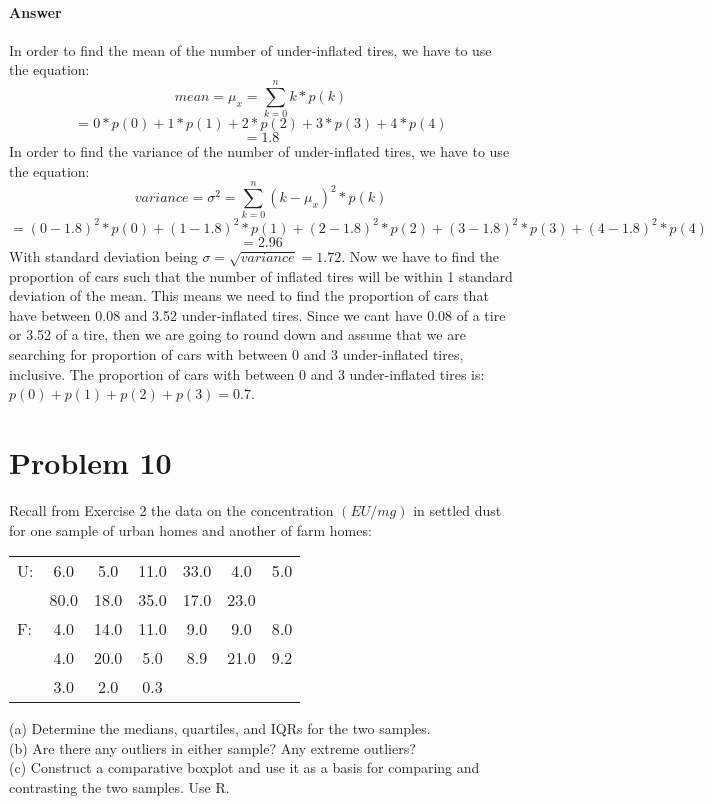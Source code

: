 \documentclass{article}
\begin{document}
	\paragraph{Answer} In order to find the mean of the number of under-inflated tires, we have to use the equation:
	\begin{displaymath}
		mean = \mu_x = \sum_{k=0}^{n}k*p(k)
	\end{displaymath}
	\begin{displaymath}
		= 0*p(0) + 1*p(1) + 2*p(2) + 3*p(3) + 4*p(4)
	\end{displaymath}
	\begin{displaymath}
		= 1.8
	\end{displaymath}
	In order to find the variance of the number of under-inflated tires, we have to use the equation:
	\begin{displaymath}
		variance = \sigma^2 = \sum_{k=0}^{n} (k-\mu_x)^2*p(k)
	\end{displaymath}
	\begin{displaymath}
		= (0-1.8)^2*p(0) + (1-1.8)^2*p(1) + (2-1.8)^2*p(2) + (3-1.8)^2*p(3)+(4-1.8)^2*p(4)
	\end{displaymath}
	\begin{displaymath}
		= 2.96
	\end{displaymath}
	With standard deviation being $\sigma = \sqrt{variance} = 1.72$. Now we have to find the proportion of cars such that the number of inflated tires will be within 1 standard deviation of the mean. This means we need to find the proportion of cars that have between 0.08 and 3.52 under-inflated tires. Since we cant have 0.08 of a tire or 3.52 of a tire, then we are going to round down and assume that we are searching for proportion of cars with between 0 and 3 under-inflated tires, inclusive. The proportion of cars with between 0 and 3 under-inflated tires is: $p(0) + p(1) + p(2) + p(3) = 0.7$.

\section*{Problem 10}
	
	Recall from Exercise 2 the data on the concentration $(EU/mg)$ in settled dust for one sample of urban homes and another of farm homes: 
	\begin{table}[!htb]
	\begin{tabular}{ l c c c c c c }
		U: & 6.0 & 5.0 & 11.0 & 33.0 & 4.0 & 5.0 \\
		& 80.0 & 18.0 & 35.0 & 17.0 & 23.0 & \\
		F: & 4.0 & 14.0 & 11.0 & 9.0 & 9.0 & 8.0 \\
		& 4.0 & 20.0 & 5.0 & 8.9 & 21.0 & 9.2 \\
		& 3.0 & 2.0 & 0.3 & & & 
	\end{tabular}
	\end{table}
	(a) Determine the medians, quartiles, and IQRs for the two samples. \\
	(b) Are there any outliers in either sample? Any extreme outliers? \\
	(c) Construct a comparative boxplot and use it as a basis for comparing and contrasting the two 
	samples. Use R.
\end{document}
